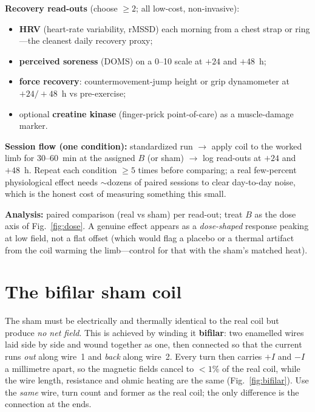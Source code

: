 \documentclass[11pt,a4paper]{article}
\begin{document}
\medskip\noindent\textbf{Recovery read-outs} (choose $\ge2$; all
low-cost, non-invasive):
\begin{itemize}\itemsep2pt
\item \textbf{HRV} (heart-rate variability, rMSSD) each morning from a
  chest strap or ring---the cleanest daily recovery proxy;
\item \textbf{perceived soreness} (DOMS) on a 0--10 scale at $+24$ and
  $+48$~h;
\item \textbf{force recovery}: countermovement-jump height or grip
  dynamometer at $+24/+48$~h vs pre-exercise;
\item optional \textbf{creatine kinase} (finger-prick point-of-care) as a
  muscle-damage marker.
\end{itemize}

\medskip\noindent\textbf{Session flow (one condition):} standardized run
$\rightarrow$ apply coil to the worked limb for 30--60~min at the assigned
$B$ (or sham) $\rightarrow$ log read-outs at $+24$ and $+48$~h. Repeat each
condition $\ge5$ times before comparing; a real few-percent physiological
effect needs $\sim$dozens of paired sessions to clear day-to-day noise,
which is the honest cost of measuring something this small.

\medskip\noindent\textbf{Analysis:} paired comparison (real vs sham) per
read-out; treat $B$ as the dose axis of Fig.~\ref{fig:dose}. A genuine
effect appears as a \emph{dose-shaped} response peaking at low field, not a
flat offset (which would flag a placebo or a thermal artifact from the
coil warming the limb---control for that with the sham's matched heat).

\section{The bifilar sham coil}
\label{sec:sham}
The sham must be electrically and thermally identical to the real coil but
produce \emph{no net field}. This is achieved by winding it
\textbf{bifilar}: two enamelled wires laid side by side and wound together
as one, then connected so that the current runs \emph{out} along wire~1 and
\emph{back} along wire~2. Every turn then carries $+I$ and $-I$ a
millimetre apart, so the magnetic fields cancel to $<1\%$ of the real coil,
while the wire length, resistance and ohmic heating are the same
(Fig.~\ref{fig:bifilar}). Use the \emph{same} wire, turn count and former
as the real coil; the only difference is the connection at the ends.
\end{document}
